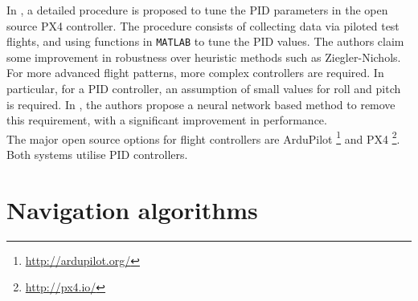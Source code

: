 \documentclass[capstone_report.tex]{subfiles}
\begin{document}
In \cite{saengphet}, a detailed procedure is proposed to tune the PID parameters in the open source PX4 controller. The procedure consists of collecting data via piloted test flights, and using functions in \texttt{MATLAB} to tune the PID values. The authors claim some improvement in robustness over heuristic methods such as Ziegler-Nichols.\\

For more advanced flight patterns, more complex controllers are required. In particular, for a PID controller, an assumption of small values for roll and pitch is required. In \cite{wang}, the authors propose a neural network based method to remove this requirement, with a significant improvement in performance.\\

The major open source options for flight controllers are ArduPilot \footnote{\url{http://ardupilot.org/}} and PX4 \footnote{\url{http://px4.io/}}. Both systems utilise PID controllers.\\


\section{Navigation algorithms}
\end{document}
